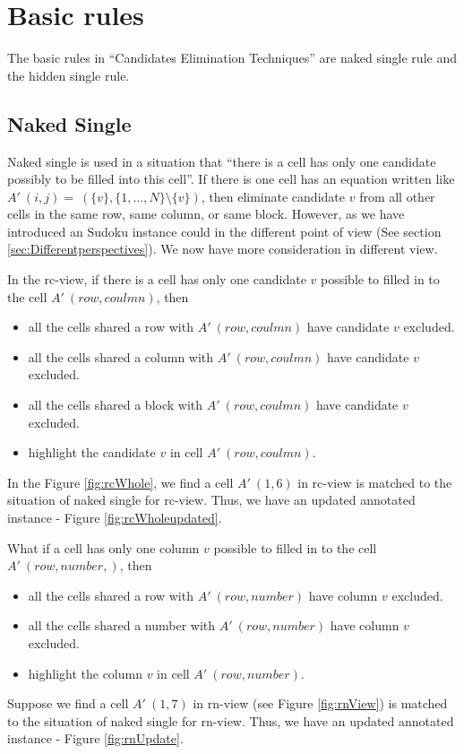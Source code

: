 \documentclass[11pt]{report}
\newcommand{\set}[1]{\{ #1 \}}
\begin{document}
\section{Basic rules}
\label{sec:Basicrules}
The basic rules in ``Candidates Elimination Techniques'' are naked single rule and the hidden single rule.

\subsection{Naked Single}
\label{sec:Nakedsingle}

Naked single is used in a situation that ``there is a cell has only one candidate possibly to be filled into this cell''. If there is one cell has an equation written like $A'\ (i,j) =\ (\set{v}, \set{1,\dots,N} \setminus \set{v})$, then eliminate candidate $v$ from all other cells in the same row, same column, or same block.
However, as we have introduced an Sudoku instance could in the different point of view (See section \ref{sec:Differentperspectives}). We now have more consideration in different view.

In the rc-view, if there is a cell has only one candidate $v$ possible to filled in to the cell $A'\ (row, coulmn)$, then
\begin{itemize}
\item all the cells shared a row with $A'\ (row, coulmn)$ have candidate $v$ excluded.
\item all the cells shared a column with $A'\ (row, coulmn)$ have candidate $v$ excluded.
\item all the cells shared a block with $A'\ (row, coulmn)$ have candidate $v$ excluded.
\item highlight the candidate $v$ in cell $A'\ (row, coulmn)$.
\end{itemize}
In the Figure \ref{fig:rcWhole}, we find a cell $A'\ (1, 6)$ in rc-view is matched to the situation of naked single for rc-view. Thus, we have an updated annotated instance - Figure \ref{fig:rcWholeupdated}.

What if a cell has only one column $v$ possible to filled in to the cell $A'\ (row, number,)$, then
\begin{itemize}
\item all the cells shared a row with $A'\ (row, number)$ have column $v$ excluded.
\item all the cells shared a number with $A'\ (row, number)$ have column $v$ excluded.
\item highlight the column $v$ in cell $A'\ (row, number)$.
\end{itemize}
Suppose we find a cell $A'\ (1, 7)$ in rn-view (see Figure \ref{fig:rnView}) is matched to the situation of naked single for rn-view. Thus, we have an updated annotated instance - Figure \ref{fig:rnUpdate}.
\end{document}

